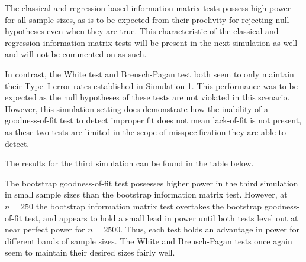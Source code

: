 \documentclass[submit]{smj}
\begin{document}
The classical and regression-based information matrix tests possess high power for all sample sizes, as is to be expected from their proclivity for rejecting null hypotheses even when they are true.
This characteristic of the classical and regression information matrix tests will be present in the next simulation as well and will not be commented on as such. 

In contrast, the White test and Breusch-Pagan test both seem to only maintain their Type~I error rates established in Simulation 1. This performance was to be expected
as the null hypotheses of these tests are not violated in this scenario. However, this simulation setting does demonstrate how the inability of a goodness-of-fit test to detect improper
fit does not mean lack-of-fit is not present, as these two tests are limited in the scope of misspecification they are able to detect.

The results for the third simulation can be found in the table below.

\begin{table}[H]
	\centering
	\small\addtolength{\tabcolsep}{-3pt}
	\setlength\extrarowheight{-3pt}
	{
	}
	\end{table}

The bootstrap goodness-of-fit test possesses higher power in the third simulation in small sample sizes than the bootstrap information matrix test. However, at $n = 250$ the bootstrap information matrix test
overtakes the bootstrap goodness-of-fit test, and appears to hold a small lead in power until both tests level out at near perfect power for $n = 2500$. Thus, each test holds an advantage in power for different bands of sample sizes.
The White and Breusch-Pagan tests once again seem to maintain their desired sizes fairly well.
\end{document}

